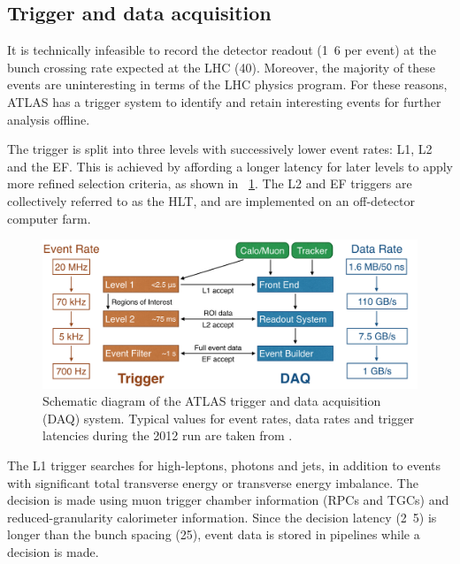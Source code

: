 \subsection{Trigger and data acquisition}
\label{sec:atlas:trig}

It is technically infeasible to record the detector readout (\unit{1.6}{\mega\bel} per 
event) at the bunch crossing rate expected at the \ac{LHC} (\unit{40}{\mega\hertz}).
Moreover, the majority of these events are uninteresting in terms of the \ac{LHC} physics 
program. For these reasons, ATLAS has a trigger system to identify and retain interesting
events for further analysis offline.

The trigger is split into three levels with successively lower event rates: \ac{L1}, 
\ac{L2} and the \ac{EF}. This is achieved by affording a longer latency for later levels 
to apply more refined selection criteria, as shown in \Figure~\ref{fig:trigger}. The 
\ac{L2} and \ac{EF} triggers are collectively referred to as the \ac{HLT}, and are 
implemented on an off-detector computer farm.

\begin{figure}
	\includegraphics[width=\textwidth]{tex/experiment/trigger}
	\caption{Schematic diagram of the ATLAS trigger and data acquisition (DAQ) system.
	Typical values for event rates, data rates and trigger latencies during the 2012 run 
	are taken from \cite{TriggerNumbers}.}
	\label{fig:trigger}
\end{figure}

The \ac{L1} trigger searches for high-\pt leptons, photons and jets, in addition to 
events with significant total transverse energy or transverse energy imbalance. The 
decision is made using muon trigger chamber information (\acp{RPC} and \acp{TGC}) and 
reduced-granularity calorimeter information. Since the decision latency 
(\unit{2.5}{\micro\second}) is longer than the bunch spacing (\unit{25}{\nano\second}),
event data is stored in pipelines while a decision is made.


